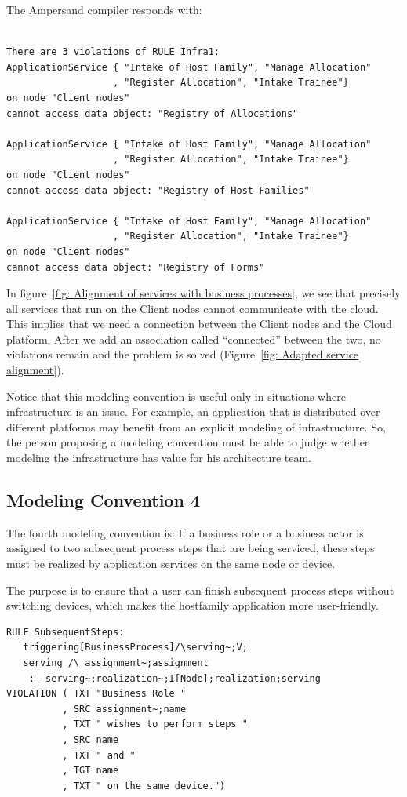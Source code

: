 \documentclass[sn-vancouver]{sn-jnl}%
\theoremstyle{thmstyleone}%
\theoremstyle{thmstyletwo}%
\theoremstyle{thmstylethree}%
\begin{document}
The Ampersand compiler responds with:

{\small
\begin{verbatim}

There are 3 violations of RULE Infra1:
ApplicationService { "Intake of Host Family", "Manage Allocation"
                   , "Register Allocation", "Intake Trainee"}
on node "Client nodes" 
cannot access data object: "Registry of Allocations"

ApplicationService { "Intake of Host Family", "Manage Allocation"
                   , "Register Allocation", "Intake Trainee"}
on node "Client nodes" 
cannot access data object: "Registry of Host Families"

ApplicationService { "Intake of Host Family", "Manage Allocation"
                   , "Register Allocation", "Intake Trainee"}
on node "Client nodes" 
cannot access data object: "Registry of Forms"

\end{verbatim}
}
In figure~\ref{fig: Alignment of services with business processes},
we see that precisely all services that run on the Client nodes cannot communicate with the cloud.
This implies that we need a connection between the Client nodes and the Cloud platform.
After we add an association called ``connected'' between the two, no violations remain and the problem is solved (Figure~\ref{fig: Adapted service alignment}).

Notice that this modeling convention is useful only in situations where infrastructure is an issue.
For example, an application that is distributed over different platforms may benefit from an explicit modeling of infrastructure.
So, the person proposing a modeling convention must be able to judge whether modeling the infrastructure has value for his architecture team.

\subsection{Modeling Convention 4}\label{Modeling Convention 4}
The fourth modeling convention is:
If a business role or a business actor is assigned to two subsequent process steps that are being serviced,
these steps must be realized by application services on the same node or device.

The purpose is to ensure that a user can finish subsequent process steps without switching devices,
which makes the hostfamily application more user-friendly.

{\small
\begin{lstlisting}[frame=single, label={mc4}, caption={}]
RULE SubsequentSteps:
   triggering[BusinessProcess]/\serving~;V;
   serving /\ assignment~;assignment
    :- serving~;realization~;I[Node];realization;serving
VIOLATION ( TXT "Business Role "
          , SRC assignment~;name
          , TXT " wishes to perform steps "
          , SRC name
          , TXT " and "
          , TGT name
          , TXT " on the same device.")
\end{lstlisting}
}
\end{document}
